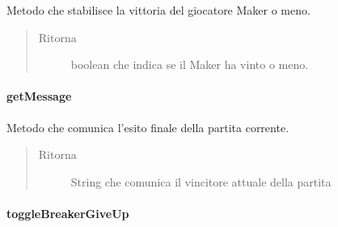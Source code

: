 \documentclass[letterpaper,10pt,italian,openany,oneside]{sphinxmanual}
\begin{document}
\begin{fulllineitems}
\label{\detokenize{test/it/unicam/cs/pa/mastermind/gamecore/MatchState:it.unicam.cs.pa.mastermind.gamecore.MatchState.getHasMakerWon()}}
Metodo che stabilisce la vittoria del giocatore Maker o meno.
\begin{quote}\begin{description}
\item[{Ritorna}] \leavevmode
boolean che indica se il Maker ha vinto o meno.

\end{description}\end{quote}

\end{fulllineitems}



\paragraph{getMessage}
\label{\detokenize{test/it/unicam/cs/pa/mastermind/gamecore/MatchState:getmessage}}

\begin{fulllineitems}
\label{\detokenize{test/it/unicam/cs/pa/mastermind/gamecore/MatchState:it.unicam.cs.pa.mastermind.gamecore.MatchState.getMessage()}}
Metodo che comunica l’esito finale della partita corrente.
\begin{quote}\begin{description}
\item[{Ritorna}] \leavevmode
String che comunica il vincitore attuale della partita

\end{description}\end{quote}

\end{fulllineitems}



\paragraph{toggleBreakerGiveUp}
\label{\detokenize{test/it/unicam/cs/pa/mastermind/gamecore/MatchState:togglebreakergiveup}}
\end{document}
